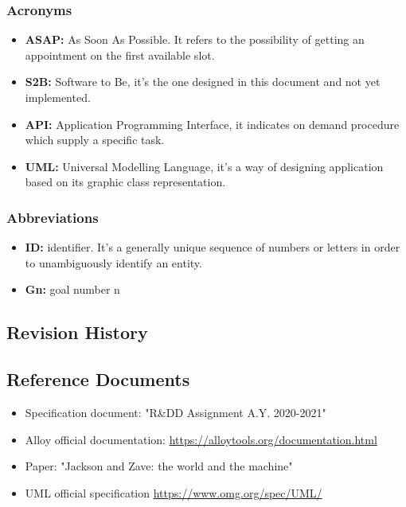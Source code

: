 \documentclass[table, 12pt]{article}
\begin{document}
\subsubsection{Acronyms}
\begin{itemize}
    \item {\textbf{ASAP:} As Soon As Possible. It refers to the possibility of getting an appointment on the first available slot.}
    \item {\textbf{S2B:} Software to Be, it's the one designed in this document and not yet implemented.}
    \item {\textbf{API:} Application Programming Interface, it indicates on demand procedure which supply a specific task.}
    \item {\textbf{UML:} Universal Modelling Language, it's a way of designing application based on its graphic class representation.}
\end{itemize}
\subsubsection{Abbreviations}
\begin{itemize}
    \item {\textbf{ID:} identifier. It's a generally unique sequence of numbers or letters in order to unambiguously identify an entity.}
    \item {\textbf{Gn:} goal number n}
\end{itemize}
\subsection{Revision History}
\subsection{Reference Documents}
\begin{itemize}
    \item {Specification document: "R\&DD Assignment A.Y. 2020-2021"}
    \item {Alloy official documentation: \href{https://alloytools.org/documentation.html}{https://alloytools.org/documentation.html}}
    \item {Paper: "Jackson and Zave: the world and the machine"}
    \item {UML official specification \href{https://www.omg.org/spec/UML/}{https://www.omg.org/spec/UML/}}
\end{itemize}
\end{document}
